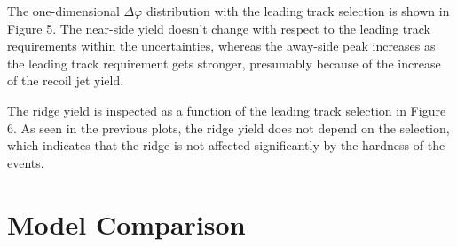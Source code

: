 The one-dimensional $\Delta\varphi$ distribution with the leading track selection is shown in Figure 5. The near-side yield doesn't change with respect to the leading track requirements within the uncertainties, whereas the away-side peak increases as the leading track requirement gets stronger, presumably because of the increase of the recoil jet yield.

The ridge yield is inspected as a function of the leading track selection in Figure 6. As seen in the previous plots, the ridge yield does not depend on the selection, which indicates that the ridge is not affected significantly by the hardness of the events.

\section{Model Comparison}


